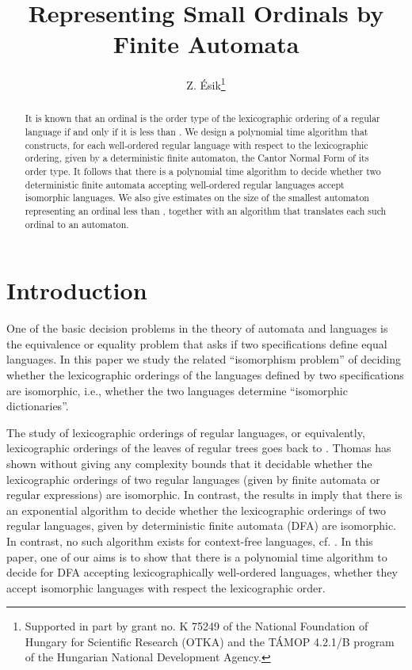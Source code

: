 \documentclass[copyright]{eptcs}
\title{Representing Small Ordinals by Finite Automata}
\author{Z. \'Esik\thanks{Supported in part by grant no. K 75249 of the National Foundation of
Hungary for Scientific Research (OTKA) and the T\'AMOP 4.2.1/B program of the Hungarian National Development Agency.}
\institute{
Dept. of Computer Science\\
University of Szeged\\
Hungary}
\email{ze@inf.u-szeged.hu}
}
\begin{document}
\maketitle


\begin{abstract}
It is known that an ordinal is the order type of the lexicographic
ordering of a regular language if and only if it is less than
. We design a polynomial time algorithm that 
constructs, for each  well-ordered regular language 
with respect to the lexicographic ordering, given by a deterministic 
finite automaton, the Cantor Normal Form of its order type. It follows that 
there is a polynomial time algorithm to decide whether two  
deterministic finite automata accepting well-ordered regular 
languages accept isomorphic languages.    
We also give estimates on the size of the smallest automaton
representing an ordinal less than , together with
an algorithm that translates each such ordinal to an automaton.
\end{abstract} 



\section{Introduction}

One of the basic decision problems in the theory of automata and languages
is the equivalence or equality problem that asks if two specifications
define equal languages. In this paper we study the related ``isomorphism problem''
of deciding whether the lexicographic orderings of the languages 
defined by two specifications are isomorphic, i.e., whether 
the two languages determine ``isomorphic dictionaries''.  


The study of lexicographic orderings of regular languages, or equivalently, 
lexicographic orderings of the leaves of regular trees goes back
to \cite{Courcelle}. 
Thomas \cite{Thomas} has shown without giving any 
complexity bounds that it decidable whether the lexicographic orderings of two regular languages 
(given by finite automata or regular expressions) are isomorphic.
In contrast, the results in \cite{BEregwords} imply that there is an exponential 
algorithm to decide whether the lexicographic orderings 
of two regular languages, given by deterministic finite automata (DFA) 
are isomorphic. In contrast, no such algorithm exists
for context-free languages, cf. \cite{EsCF}.
In this paper, one of our aims is to show that there is a polynomial time 
algorithm to decide for DFA accepting lexicographically well-ordered 
languages, whether they accept isomorphic languages with respect
the lexicographic order.
\end{document}
